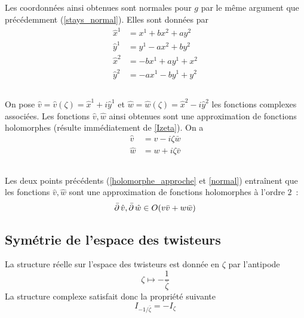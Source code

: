 \documentclass[11pt,draft,twocolumn,makeidx]{amsart}
\numberwithin{equation}{subsection}
\begin{document}
\subsection{\label{normal}} Les coordonnées ainsi obtenues sont normales pour $g$ par le même argument que précédemment ({\ref{stays_normal}}). Elles sont données par
\begin{align*}
\hat{x}^1 & =   x^1 + bx^2  +ay^2\\
\hat{y}^1 & = y^1 -ax^2 + by^2\\
\hat{x}^2 & = -bx^1 + ay^1 + x^2\\
\hat{y}^2 & =-ax^1 - by^1 + y^2
\end{align*}
\subsection{\label{holomorphe_approche}} On pose $\hat{v} = \hat{v}(\zeta) = \hat{x}^1 + i \hat{y}^1$ et $\hat{w} = \hat{w}(\zeta) = \hat{x}^2 - i \hat{y}^2$ les fonctions complexes associées. Les fonctions $\hat{v},\hat{w}$ ainsi obtenues sont une approximation de fonctions holomorphes (résulte immédiatement de \eqref{Izeta}).
On a
\begin{align}\label{coordapprox}
\hat{v}  &= v - i\zeta \bar{w}\\
\hat{w}  &= w + i\zeta \bar{v}
\end{align}
\subsection{} Les deux points précédents (\autoref{holomorphe_approche} et \autoref{normal}) entraînent que les fonctions $\hat{v},\hat{w}$ sont une approximation de fonctions holomorphes à l'ordre $2$~:
\[
\operatorname{\bar{\partial}} \hat{v} , \operatorname{\bar{\partial}} \hat{w}  \in  O(v\bar{v} + w\bar{w})
\]
\subsection{Symétrie de l'espace des twisteurs} La structure réelle sur l'espace des twisteurs est donnée en $\zeta$ par l'antipode
\begin{equation}
\zeta \mapsto -\dfrac{1}{\bar{\zeta}}
\end{equation}
La structure complexe satisfait donc la propriété suivante
\begin{equation}
I_{-1/\bar{\zeta}} = -I_\zeta
\end{equation}
\end{document}
